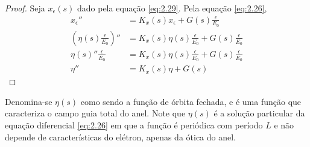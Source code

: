\begin{proof}
	Seja $x_\epsilon(s)$ dado pela equação \eqref{eq:2.29}. Pela equação \eqref{eq:2.26},
	\begin{align*}
        x_\epsilon'' &= K_x(s)x_\epsilon + G(s)\frac{\epsilon}{E_0}\\
        \left(\eta(s)\frac{\epsilon}{E_0}\right)'' &= K_x(s)\eta(s)\frac{\epsilon}{E_0} + G(s)\frac{\epsilon}{E_0}\\
        \eta(s)''\frac{\epsilon}{E_0} &= K_x(s)\eta(s)\frac{\epsilon}{E_0} + G(s)\frac{\epsilon}{E_0}\\
        \eta'' &= K_x(s)\eta + G(s)
	\end{align*}
\end{proof}
	
Denomina-se $\eta(s)$ como sendo a função de órbita fechada, e é uma função que caracteriza o campo guia total do anel. Note que $\eta (s)$ é a solução particular da equação diferencial \eqref{eq:2.26} em que a função é periódica com período $L$ e não depende de características do elétron, apenas da ótica do anel.